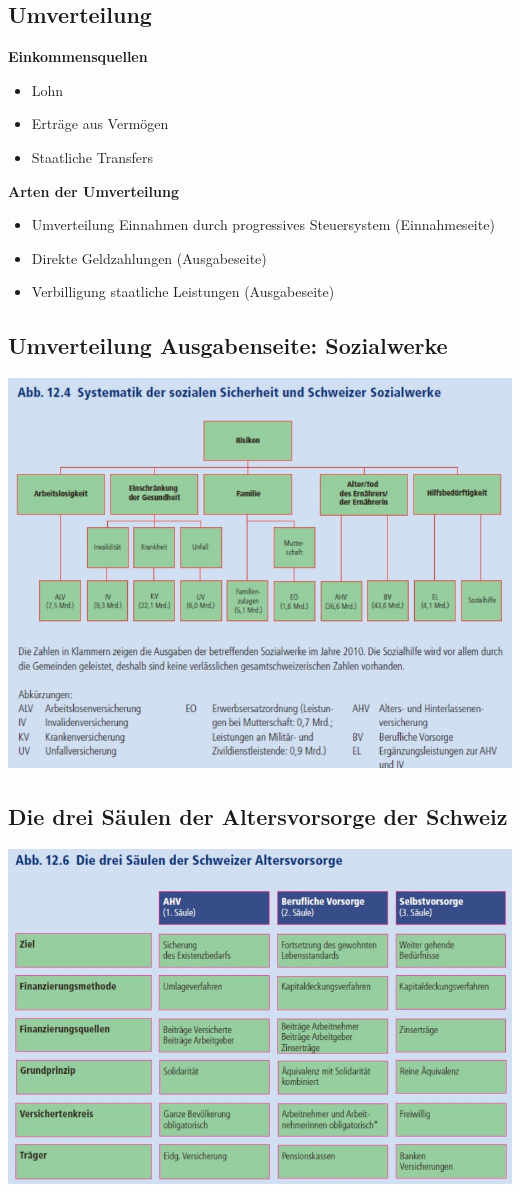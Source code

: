 \subsection{Umverteilung} 
\begin{minipage}{5cm}
	\textbf{Einkommensquellen}
	\begin{itemize}
		\item Lohn
		\item Erträge aus Vermögen
		\item Staatliche Transfers
	\end{itemize}
\end{minipage}
\begin{minipage}{15cm}
	\textbf{Arten der Umverteilung}
	\begin{itemize}
		\item Umverteilung Einnahmen durch progressives Steuersystem (Einnahmeseite)
		\item Direkte Geldzahlungen (Ausgabeseite)
		\item Verbilligung staatliche Leistungen (Ausgabeseite)
	\end{itemize}
\end{minipage}
\clearpage
\pagebreak
\subsection{Umverteilung Ausgabenseite: Sozialwerke}
\includegraphics[width=0.8\linewidth]{images/sozialwerke.jpg}
\subsection{Die drei Säulen der Altersvorsorge der Schweiz}
\includegraphics[width=0.8\linewidth]{images/dreisaulen.jpg}
\clearpage
\pagebreak